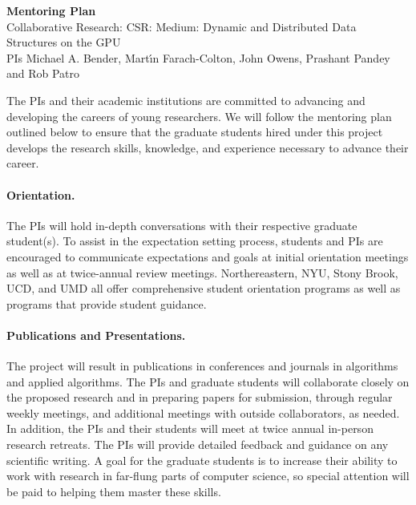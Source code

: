 

\thispagestyle{empty}

\begin{center}
   \textbf{Mentoring Plan}\\
 Collaborative Research: CSR: Medium: Dynamic and Distributed Data Structures on the GPU\\
 PIs Michael A. Bender, Mart\'{\i}n Farach-Colton, John Owens, Prashant Pandey and Rob Patro
\end{center}

The PIs and their academic institutions are committed to advancing and developing the careers of young researchers. We will follow the mentoring plan outlined below to ensure that the graduate students hired under this project develops the research skills, knowledge, and experience necessary
to advance their career.

\paragraph{Orientation.} The PIs will hold in-depth conversations with their respective graduate student(s). To assist in the expectation setting process, students and PIs are encouraged to communicate expectations and goals at initial orientation meetings as well as at twice-annual review meetings. Northereastern, NYU, Stony Brook, UCD, and UMD all offer comprehensive student orientation programs as well as programs that provide student guidance.

\paragraph{Publications and Presentations.} The project will result in publications in conferences and journals in algorithms and applied algorithms. The PIs and graduate students will collaborate closely on the proposed research and in preparing papers for submission, through regular weekly meetings, and additional meetings with outside collaborators, as needed. In addition, the PIs and their students will meet at twice annual in-person research retreats. The PIs will provide detailed feedback and guidance on any scientific writing. A goal for the graduate students is to increase their ability to work with research in far-flung parts of computer science, so special attention will be paid to helping them master these skills.

